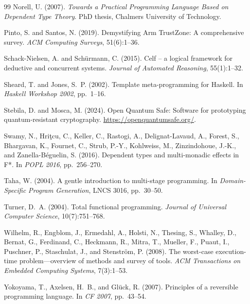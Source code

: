 \documentclass[11pt,a4paper]{article}
\begin{document}
\begin{thebibliography}{99}
Norell, U. (2007).
\newblock \emph{Towards a Practical Programming Language Based on Dependent Type Theory}.
\newblock PhD thesis, Chalmers University of Technology.

Pinto, S. and Santos, N. (2019).
\newblock Demystifying Arm TrustZone: A comprehensive survey.
\newblock \emph{ACM Computing Surveys}, 51(6):1--36.

Schack-Nielsen, A. and Sch\"{u}rmann, C. (2015).
\newblock Celf -- a logical framework for deductive and concurrent systems.
\newblock \emph{Journal of Automated Reasoning}, 55(1):1--32.

Sheard, T. and Jones, S.~P. (2002).
\newblock Template meta-programming for Haskell.
\newblock In \emph{Haskell Workshop 2002}, pp.~1--16.

Stebila, D. and Mosca, M. (2024).
\newblock Open Quantum Safe: Software for prototyping quantum-resistant cryptography.
\newblock \url{https://openquantumsafe.org/}.

Swamy, N., Hri\c{t}cu, C., Keller, C., Rastogi, A., Delignat-Lavaud, A., Forest, S., Bhargavan, K., Fournet, C., Strub, P.-Y., Kohlweiss, M., Zinzindohoue, J.-K., and Zanella-B\'{e}guelin, S. (2016).
\newblock Dependent types and multi-monadic effects in F*.
\newblock In \emph{POPL 2016}, pp.~256--270.

Taha, W. (2004).
\newblock A gentle introduction to multi-stage programming.
\newblock In \emph{Domain-Specific Program Generation}, LNCS 3016, pp.~30--50.

Turner, D.~A. (2004).
\newblock Total functional programming.
\newblock \emph{Journal of Universal Computer Science}, 10(7):751--768.

Wilhelm, R., Engblom, J., Ermedahl, A., Holsti, N., Thesing, S., Whalley, D., Bernat, G., Ferdinand, C., Heckmann, R., Mitra, T., Mueller, F., Puaut, I., Puschner, P., Staschulat, J., and Stenstr\"{o}m, P. (2008).
\newblock The worst-case execution-time problem---overview of methods and survey of tools.
\newblock \emph{ACM Transactions on Embedded Computing Systems}, 7(3):1--53.

Yokoyama, T., Axelsen, H.~B., and Gl\"{u}ck, R. (2007).
\newblock Principles of a reversible programming language.
\newblock In \emph{CF 2007}, pp.~43--54.

\end{thebibliography}
\end{document}
